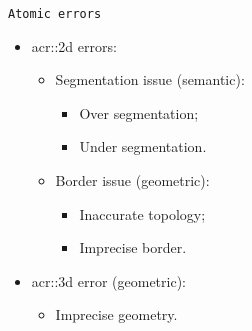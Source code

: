 \documentclass[10pt]{beamer}
\begin{document}
            \begin{frame}{\texttt{Atomic errors}}
                \begin{itemize}[label=$\blacktriangleright$, font=\color{IGNGreen}, itemsep=2em]
                    \item<1-> \Acrfull{acr::2d} errors:
                        \begin{itemize}[label=$\blacktriangleright$, font=\color{IGNGreen}]
                            \item<2-> Segmentation issue (semantic):
                                \begin{itemize}
                                    \item<3-> Over segmentation;
                                    \item<4-> Under segmentation.      
                                \end{itemize}
                            \item<5-> Border issue (geometric):
                            \begin{itemize}
                                \item<6-> Inaccurate topology;
                                \item<7-> Imprecise border.      
                            \end{itemize}
                        \end{itemize}
                    \item<8-> \gls{acr::3d} error (geometric):
                        \begin{itemize}[label=$\blacktriangleright$, font=\color{IGNGreen}]
                            \item<9-> Imprecise geometry.
                        \end{itemize}
                \end{itemize}
            \end{frame}
\end{document}
